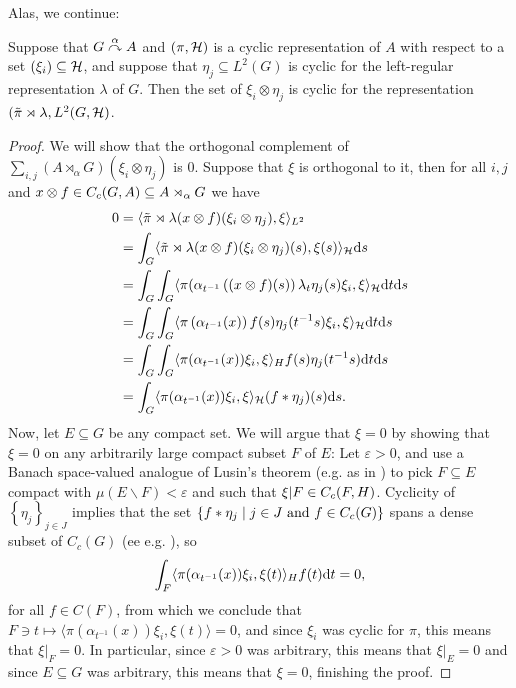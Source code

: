 Alas, we continue:
\begin{lemma}
	Suppose that $G \stackrel{\alpha}{\curvearrowright} A$ and $(\pi,\mathcal{H})$ is a cyclic representation of $A$ with respect to a set $(\xi_i) \subseteq \mathcal{H}$, and suppose that $\eta_j \subseteq L^2(G)$ is cyclic for the left-regular representation $\lambda$ of $G$. Then the set of $\xi_i \otimes \eta_j$ is cyclic for the representation $(\tilde \pi \rtimes \lambda, L^2(G,\mathcal{H})$.
	\label{mult:cyclic1}
\end{lemma}
\begin{proof}
	We will show that the orthogonal complement of $\sum_{i,j} (A \rtimes_\alpha G)(\xi_i \otimes \eta_j)$ is $0$. Suppose that $\xi$ is orthogonal to it, then for all $i,j$ and $x \otimes f \in C_c(G,A) \subseteq A \rtimes_\alpha G$ we have
	\begin{align*}
		0 &= \langle \tilde \pi \rtimes \lambda (x \otimes f) (\xi_i \otimes \eta_j) , \xi \rangle_{L^2}\\
		&= \int_G \langle \tilde \pi \rtimes \lambda (x \otimes f) (\xi_i \otimes \eta_j)(s) , \xi(s)\rangle_{\mathcal{H}} \mathrm{d} s \\
		&= \int_G \int_G \langle \pi(\alpha_{t^{-1}}\left( (x \otimes f)(s) \right) \lambda_t \eta_j(s) \xi_i , \xi \rangle_{\mathcal{H}} \mathrm{d} t \mathrm{d} s\\
		&= \int_G \int_G \langle \pi\left( \alpha_{t^{-1}} (x) \right) f(s) \eta_j(t^{-1}s) \xi_i , \xi \rangle_{\mathcal{H}} \mathrm{d} t\mathrm{d} s\\
		&= \int_G \int_G \langle \pi( \alpha_{t^{-1}}(x) ) \xi_i , \xi \rangle_H f(s) \eta_j(t^{-1}s) \mathrm{d} t \mathrm{d} s \\
		&= \int_G \langle \pi(\alpha_{t^{-1}}(x)) \xi_i , \xi \rangle_{\mathcal{H}} (f \ast \eta_j)(s) \mathrm{d} s.
	\end{align*}
	Now, let $E \subseteq G$ be any compact set. We will argue that $\xi = 0$ by showing that $\xi = 0$ on any arbitrarily large compact subset $F$ of $E$: Let $\varepsilon > 0$, and use a Banach space-valued analogue of Lusin's theorem (e.g. as in \cite[Appendix B]{williamscrossed}) to pick $F \subseteq E$ compact with $\mu(E\backslash F) < \varepsilon$ and such that $\xi|F \in C_c(F,H)$. Cyclicity of $\left\{ \eta_j \right\}_{j \in J}$ implies that the set $\{f \ast \eta_j \mid j \in J \text{ and } f \in C_c(G)\}$ spans a dense subset of $C_c(G)$ (ee e.g. \cite[Proposition 3.33]{folland2016fourier}), so
	\begin{align*}
		\int_{F} \langle \pi(\alpha_{t^{-1}}(x)) \xi_i , \xi(t) \rangle_H f(t) \mathrm{d} t = 0,
	\end{align*}
	for all $f \in C(F)$, from which we conclude that $F \ni t \mapsto \langle \pi(\alpha_{t^{-1}}(x)) \xi_i , \xi(t) \rangle=0$, and since $\xi_i$ was cyclic for $\pi$, this means that $\xi|_F = 0$. In particular, since $\varepsilon > 0$ was arbitrary, this means that $\xi|_E = 0$ and since $E \subseteq G$ was arbitrary, this means that $\xi = 0$, finishing the proof.
\end{proof}

